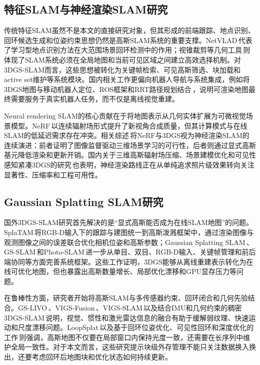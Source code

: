 \subsection{特征SLAM与神经渲染SLAM研究}

传统特征SLAM虽然不是本文的直接研究对象，但其形成的前端跟踪、地点识别、回环候选生成和位姿约束思想仍然是高斯SLAM系统的重要支撑。NetVLAD\,\cite{arandjelovic2016netvlad}代表了学习型地点识别方法在大范围场景回环检测中的作用；视锥裁剪等几何工具\,\cite{gribb2001fast}则体现了SLAM系统必须在全局地图和当前可见区域之间建立高效选择机制。对3DGS-SLAM而言，这些思想被转化为关键帧检索、可见高斯筛选、块加载和active set维护等系统模块。国内相关工作更偏向机器人导航与系统集成，例如将3DGS地图与移动机器人定位、ROS框架和RRT路径规划结合\,\cite{ma2025robot3dgs,liu2025rrt3dgs}，说明可渲染地图最终需要服务于真实机器人任务，而不仅是离线视觉重建。

Neural rendering SLAM的核心贡献在于将地图表示从几何实体扩展为可微视觉场景模型。NeRF\,\cite{mildenhall2020nerf}以连续辐射场形式提升了新视角合成质量，但其计算模式与在线SLAM的低延迟需求存在冲突。相关综述\,\cite{tosi2025nerf3dgs_slam,hadero2025beyond}将NeRF与3DGS视为神经渲染SLAM的连续演进：前者证明了图像监督驱动三维场景学习的可行性，后者则通过显式高斯基元降低渲染和更新开销。国内关于三维高斯辐射场压缩、场景建模优化和可见性感知紧凑3DGS的研究\,\cite{songmingqing2025probecompression,wansiyao2025gaussianopt,hejinxu2025compact3dgs}也表明，神经渲染路线正在从单纯追求照片级效果转向关注显著性、压缩率和工程可用性。

\subsection{Gaussian Splatting SLAM研究}

国外3DGS-SLAM研究首先解决的是“显式高斯能否成为在线SLAM地图”的问题。SplaTAM\,\cite{keetha2024splatam}将RGB-D输入下的跟踪与建图统一到高斯泼溅框架中，通过渲染图像与观测图像之间的误差联合优化相机位姿和高斯参数；Gaussian Splatting SLAM\,\cite{matsuki2024gaussiansplatting}、GS-SLAM\,\cite{yan2024gsslam}和Photo-SLAM\,\cite{huang2024photoslam}进一步从单目、双目、RGB-D输入、关键帧管理和前后端协同等方面完善系统框架。这些工作证明，3DGS能够从离线重建表示转化为在线可优化地图，但也暴露出高斯数量增长、局部优化漂移和GPU显存压力等问题。

在鲁棒性方面，研究者开始将高斯SLAM与多传感器约束、回环闭合和几何先验结合。GS-LIVO\,\cite{hong2025gslivo}、VIGS-Fusion\,\cite{ndoye2025vigsfusion}、VIGS-SLAM\,\cite{zhu2026vigsslam}以及结合IMU和几何约束的稠密3DGS-SLAM\,\cite{che2026denseimu}说明，视觉、惯性和激光雷达信息的融合有助于缓解弱纹理、快速运动和尺度漂移问题。LoopSplat\,\cite{zhu2025loopsplat}以及基于回环位姿优化、可见性回环和深度优化的工作\,\cite{wang2024looploss,xiao2025visibilityloop}则强调，高斯地图不仅要在局部窗口内保持光度一致，还需要在长序列中维护全局一致性。对于本文而言，这些研究提示块级外存管理不能只关注数据换入换出，还要考虑回环后地图块和优化状态如何持续更新。

